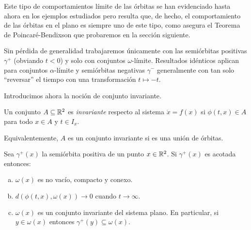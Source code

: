 Este tipo de comportamientos límite de las órbitas se han evidenciado hasta ahora en los ejemplos estudiados pero resulta que, de hecho, el comportamiento de las órbitas en el plano es siempre uno de este tipo, como asegura el Teorema de Poincaré-Bendixson que probaremos en la sección siguiente.

Sin pérdida de generalidad trabajaremos únicamente con las semiórbitas positivas $\gamma^+$ (obviando $t < 0$) y solo con conjuntos $\omega$-límite. Resultados idénticos aplican para conjuntos $\alpha$-límite y semiórbitas negativas $\gamma^-$ generalmente con tan solo ``reversar'' el tiempo con una transformación $t \mapsto -t$.

Introducimos ahora la noción de conjunto invariante.

\begin{definition} \label{def:conjuntoinvariante}
Un conjunto $A \subseteq {\ensuremath{\mathbb{R}}}^2$ es \emph{invariante} respecto al sistema $\dot{x} = f(x)$ si $\phi(t,x) \in A$ para todo $x \in A$ y $t \in I_x$.
\end{definition}

Equivalentemente, $A$ es un conjunto invariante si es una unión de órbitas.


\begin{lemma} \label{lem:orbitaslimite}
Sea $\gamma^+(x)$ la semiórbita positiva de un punto $x \in {\ensuremath{\mathbb{R}}}^2$. Si $\gamma^+(x)$ es acotada entonces:

	\begin{enumerate}[(a)]
		\item $\omega(x)$ es no vacío, compacto y conexo.
		\item $d(\phi(t,x), \omega(x)) \to 0$ cuando $t \to \infty$.
		\item $\omega(x)$ es un conjunto invariante del sistema plano. En particular, si $y \in \omega(x)$ entonces $\gamma^+(y) \subseteq \omega(x)$.
	\end{enumerate}
\end{lemma}

